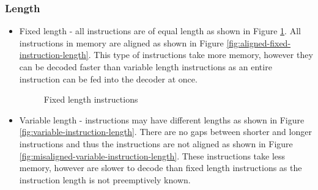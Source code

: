 \documentclass{report}
\begin{document}
\subsubsection{Length}

\begin{itemize}
    \item{Fixed length - all instructions are of equal length as shown in Figure
        \ref{fig:fixed-instruction-length}. All instructions in memory are
        aligned as shown in Figure \ref{fig:aligned-fixed-instruction-length}.
        This type of instructions take more memory, however they can be decoded
        faster than variable length instructions as an entire instruction can
        be fed into the decoder at once.}

    \begin {figure}[H]
    \centering
    \caption {Fixed length instructions}
    \label {fig:fixed-instruction-length}
    \end {figure}


    \item{Variable length - instructions may have different lengths as shown in
        Figure \ref{fig:variable-instruction-length}. There are
        no gaps between shorter and longer instructions and thus the
        instructions are not aligned as shown in Figure
        \ref{fig:misaligned-variable-instruction-length}. These instructions
        take less memory, however are slower to decode than fixed length
        instructions as the instruction length is not preemptively known.}
\end{itemize}
\end{document}
